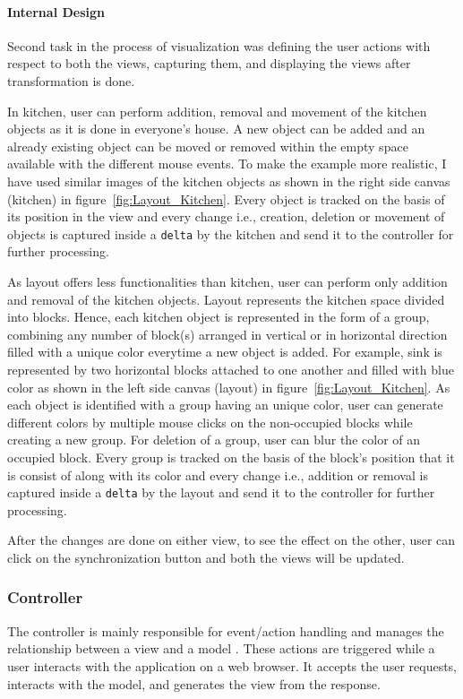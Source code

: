 \paragraph{Internal Design}
Second task in the process of visualization was defining the user actions with respect to both the views, capturing them, and displaying the views after transformation is done.

In kitchen, user can perform addition, removal and movement of the kitchen objects as it is done in everyone's house. A new object can be added and an already existing object can be moved or removed within the empty space available with the different mouse events. To make the example more realistic, I have used similar images of the kitchen objects as shown in the right side canvas (kitchen) in figure~\ref{fig:Layout_Kitchen}. Every object is tracked on the basis of its position in the view and every change i.e., creation, deletion or movement of objects is captured inside a \texttt{delta} by the kitchen and send it to the controller for further processing.

As layout offers less functionalities than kitchen, user can perform only addition and removal of the kitchen objects. Layout represents the kitchen space divided into blocks. Hence, each kitchen object is represented in the form of a group, combining any number of block(s) arranged in vertical or in horizontal direction filled with a unique color everytime a new object is added. For example, sink is represented by two horizontal blocks attached to one another and filled with {\color{blue} blue} color as shown in the left side canvas (layout) in figure~\ref{fig:Layout_Kitchen}. As each object is identified with a group having an unique color, user can generate different colors by multiple mouse clicks on the non-occupied blocks while creating a new group. For deletion of a group, user can blur the color of an occupied block. Every group is tracked on the basis of the block's position that it is consist of along with its color and every change i.e., addition or removal is captured inside a \texttt{delta} by the layout and send it to the controller for further processing.

After the changes are done on either view, to see the effect on the other, user can click on the synchronization button and both the views will be updated.
 
\subsubsection{Controller}\label{subsubsec:design_controller}
The controller is mainly responsible for event/action handling and manages the relationship between a view and a model \cite{mdd-webwithmvc}. These actions are triggered while a user interacts with the application on a web browser. It accepts the user requests, interacts with the model, and generates the view from the response.


